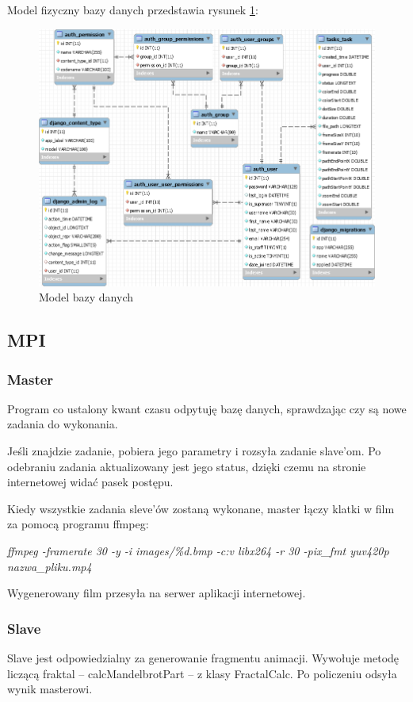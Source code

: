 \documentclass[a4paper]{article}
\begin{document}
Model fizyczny bazy danych przedstawia rysunek \ref{fig:db}:
 \begin{figure}[H]
    \centering
    \includegraphics[width=\textwidth]{sql.png}
    \caption{Model bazy danych}
    \label{fig:db}
\end{figure}


\subsection{MPI}
\subsubsection{Master}
Program co ustalony kwant czasu odpytuję bazę danych, sprawdzając czy są nowe zadania do wykonania.  

Jeśli znajdzie zadanie, pobiera jego parametry i rozsyła zadanie slave'om. Po odebraniu zadania aktualizowany jest jego status, dzięki czemu na stronie internetowej widać pasek postępu.

Kiedy wszystkie zadania sleve'ów zostaną wykonane, master łączy klatki w film za pomocą programu ffmpeg:

\textit{ffmpeg -framerate 30 -y -i images/\%d.bmp -c:v libx264 -r 30 -pix\_fmt yuv420p nazwa\_pliku.mp4}

Wygenerowany film przesyła na serwer aplikacji internetowej.

\subsubsection{Slave}
Slave jest odpowiedzialny za generowanie fragmentu animacji. Wywołuje metodę liczącą fraktal -- calcMandelbrotPart -- z klasy FractalCalc. Po policzeniu odsyła wynik masterowi.
\end{document}

